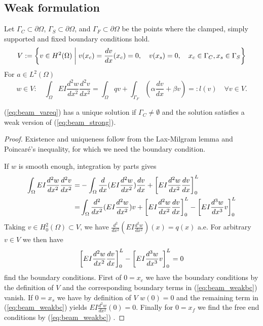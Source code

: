 \subsection{Weak formulation}\label{subsec:}
%
%
Let $\Gamma_C\subset\partial\Omega$, $\Gamma_S\subset\partial\Omega$, and $\Gamma_F\subset\partial\Omega$ be the points where the clamped, simply supported and fixed boundary conditions hold.
%
\begin{equation}\label{eq:beam_V}
V:= \left\{v\in H^2(\Omega)\;\middle|\;v(x_c)=\frac{d v}{dx}(x_c)=0, \quad v(x_s)=0,\quad x_c\in\Gamma_C,x_s\in\Gamma_S\right\}
\end{equation}
%
For $a\in L^2(\Omega)$
%
\begin{equation}\label{eq:beam_vareq}
w\in V:\quad \int_{\Omega} EI \frac{d^2 w}{dx^2}\frac{d^2 v}{dx^2}= \int_{\Omega} qv 
+ \int_{\Gamma_F} (\alpha \frac{d v}{dx}+ \beta v)=:l(v)\quad \forall v\in V.
\end{equation}
%
\begin{lemma}\label{lemma:}
(\ref{eq:beam_vareq}) has a unique solution if $\Gamma_C\ne\emptyset$ and the solution satisfies a weak version of 
(\ref{eq:beam_strong}).
\end{lemma}
%
\begin{proof}
Existence and uniqueness follow from the Lax-Milgram lemma and Poincaré's inequality, for which we need the boundary condition.

If $w$ is smooth enough, integration by parts gives
%
\begin{align*}
\int_{\Omega} EI \frac{d^2 w}{dx^2}\frac{d^2 v}{dx^2}=&-\int_{\Omega}  \frac{d}{dx}(EI \frac{d^2 w}{dx^2})\frac{d v}{dx} + \left[{EI\frac{d^2 w}{dx^2}\frac{d v}{dx}}\right]_{0}^{L}\\
=& \int_{\Omega} \frac{d^2}{dx^2}(EI \frac{d^2 w}{dx^2})v + \left[{EI\frac{d^2 w}{dx^2}\frac{d v}{dx}}\right]_{0}^{L}- \left[{EI\frac{d^3 w}{dx^3}v}\right]_{0}^{L}
\end{align*}
%
Taking $v\in H^2_0(\Omega)\subset V$, we have $\frac{d^2}{dx^2} (EI \frac{d^2 w}{dx^2})(x) = q(x)$ a.e. For arbitrary $v\in V$ we 
then have
%
\begin{equation}\label{eq:beam_weakbc}
\left[{EI\frac{d^2 w}{dx^2}\frac{d v}{dx}}\right]_{0}^{L}- \left[{EI\frac{d^3 w}{dx^3}v}\right]_{0}^{L}=0
\end{equation}
% 
find the boundary conditions. 
First of $0=x_c$ we have the boundary conditions by the definition of $V$ and the corresponding boundary terms in (\ref{eq:beam_weakbc}) vanish. If $0=x_s$ we have by definition of $V$ $w(0)=0$ and the remaining term in (\ref{eq:beam_weakbc}) yields $EI\frac{d^2 w}{dx^2}(0)=0$. Finally for $0=x_f$ we find the free end conditions by (\ref{eq:beam_weakbc}) .
\end{proof}
%
%
